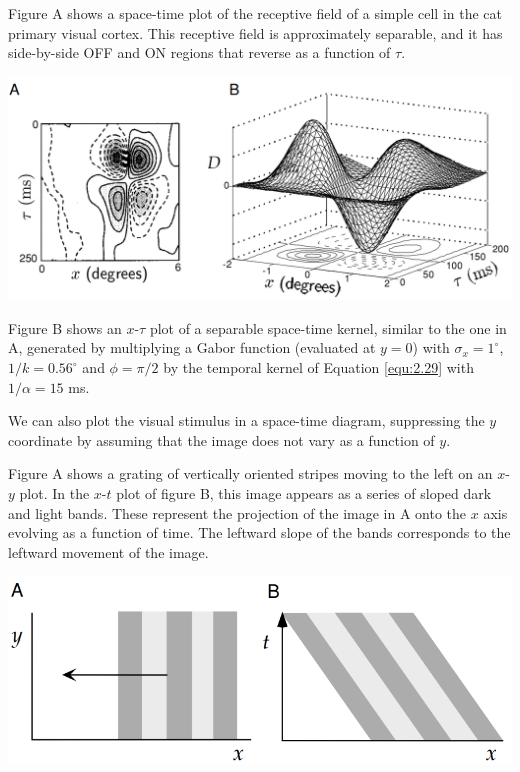 \begin{exm}
  \label{exm:separableSpaceTimePlotExm}
  Figure A shows a space-time plot of the receptive field of a simple cell in the cat primary visual cortex. This receptive field is approximately separable, and it has side-by-side OFF and ON regions that reverse as a function of $\tau$.
  \begin{center}
    \includegraphics[scale=0.2]{./png/spaceTimePlotExm}
  \end{center}
  Figure B shows an $x$-$\tau$ plot of a separable space-time kernel, similar to the one in A, generated by multiplying a Gabor function (evaluated at $y = 0$) with $\sigma_x = 1^{\circ}$, $1/k = 0.56^{\circ}$ and $\phi = \pi/2$ by the temporal kernel of Equation \ref{equ:2.29} with $1/\alpha = 15$ ms.
\end{exm}

\begin{rem}
  We can also plot the visual stimulus in a space-time diagram, suppressing the $y$ coordinate by assuming that the image does not vary as a function of $y$.
\end{rem}

\begin{exm}
  Figure A shows a grating of vertically oriented stripes moving to the left on an $x$-$y$ plot. In the $x$-$t$ plot of figure B, this image appears as a series of sloped dark and light bands. These represent the
projection of the image in A onto the $x$ axis evolving as a function of time. The leftward slope of the bands corresponds to the leftward
movement of the image.
  \begin{center}
    \includegraphics[scale=0.3]{./png/spaceTimeDiagramExm1}
  \end{center}
\end{exm}

